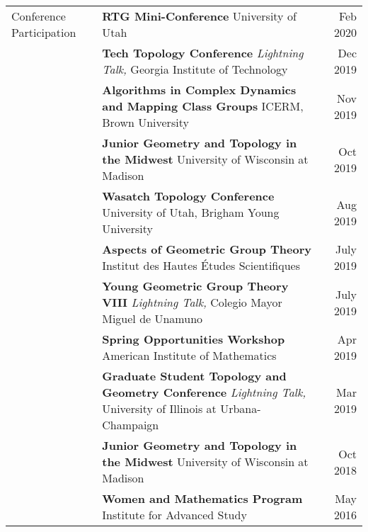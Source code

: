 \documentclass[10pt,letterpaper]{article}
\begin{document}
\begin{tabularx}{\textwidth}{HXr}
  Conference \newline Participation
  & \textbf{RTG Mini-Conference}
  \newline\hspace*{2pc} University of Utah
  & Feb 2020 \\
  & \textbf{Tech Topology Conference}
  \newline\hspace*{2pc} \emph{Lightning Talk,}  Georgia Institute of Technology
  & Dec 2019 \\
  & \textbf{Algorithms in Complex Dynamics and Mapping Class Groups}
  \newline\hspace*{2pc} ICERM, Brown University
  & Nov 2019 \\
  & \textbf{Junior Geometry and Topology in the Midwest} 
  \newline\hspace*{2pc} University of Wisconsin at Madison
  & Oct 2019 \\
  & \textbf{Wasatch Topology Conference} 
  \newline\hspace*{2pc} University of Utah, Brigham Young University
  & Aug 2019 \\
  & \textbf{Aspects of Geometric Group Theory}
  \newline \hspace*{2pc}  Institut des Hautes \'Etudes Scientifiques
  & July 2019 \\
  & \textbf{Young Geometric Group Theory VIII}
  \newline\hspace*{2pc} \emph{Lightning Talk,} Colegio Mayor Miguel de Unamuno
  & July 2019 \\
  & \textbf{Spring Opportunities Workshop}
  \newline \hspace*{2pc}  American Institute of Mathematics
  & Apr 2019 \\
  & \textbf{Graduate Student Topology and Geometry Conference}
  \newline\hspace*{2pc} \emph{Lightning Talk,} University of Illinois at
  Urbana-Champaign 
  & Mar 2019 \\
  & \textbf{Junior Geometry and Topology in the Midwest} \newline \hspace*{2pc}
   University of Wisconsin at Madison
  & Oct 2018 \\
  & \textbf{Women and Mathematics Program} \newline \hspace*{2pc}
   Institute for Advanced Study
  & May 2016
  \\
\end{tabularx}
\end{document}
